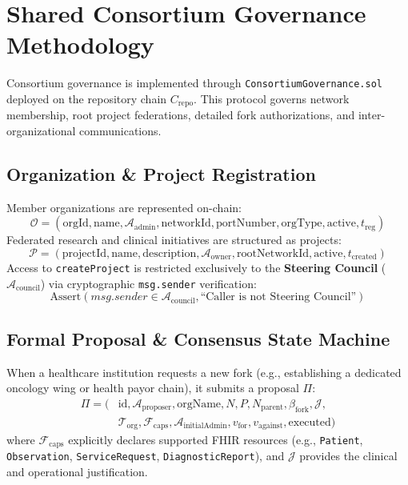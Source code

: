 \documentclass[conference]{IEEEtran}
\theoremstyle{definition}
\begin{document}
\section{Shared Consortium Governance Methodology}

Consortium governance is implemented through \texttt{ConsortiumGovernance.sol} deployed on the repository chain $C_{\text{repo}}$. This protocol governs network membership, root project federations, detailed fork authorizations, and inter-organizational communications.

\subsection{Organization \& Project Registration}
Member organizations are represented on-chain:
\begin{equation}
\mathcal{O} = (\text{orgId}, \text{name}, \mathcal{A}_{\text{admin}}, \text{networkId}, \text{portNumber}, \text{orgType}, \text{active}, t_{\text{reg}})
\end{equation}
Federated research and clinical initiatives are structured as projects:
\begin{equation}
\mathcal{P} = (\text{projectId}, \text{name}, \text{description}, \mathcal{A}_{\text{owner}}, \text{rootNetworkId}, \text{active}, t_{\text{created}})
\end{equation}
Access to \texttt{createProject} is restricted exclusively to the \textbf{Steering Council} ($\mathcal{A}_{\text{council}}$) via cryptographic \texttt{msg.sender} verification:
\begin{equation}
\text{Assert}(msg.sender \in \mathcal{A}_{\text{council}}, \text{``Caller is not Steering Council''})
\end{equation}

\subsection{Formal Proposal \& Consensus State Machine}
When a healthcare institution requests a new fork (e.g., establishing a dedicated oncology wing or health payor chain), it submits a proposal $\Pi$:
\begin{equation}
\begin{aligned}
\Pi = (& \text{id}, \mathcal{A}_{\text{proposer}}, \text{orgName}, N, P, N_{\text{parent}}, \beta_{\text{fork}}, \mathcal{J}, \\
       & \mathcal{T}_{\text{org}}, \mathcal{F}_{\text{caps}}, \mathcal{A}_{\text{initialAdmin}}, v_{\text{for}}, v_{\text{against}}, \text{executed} )
\end{aligned}
\end{equation}
where $\mathcal{F}_{\text{caps}}$ explicitly declares supported FHIR resources (e.g., \texttt{Patient}, \texttt{Observation}, \texttt{ServiceRequest}, \texttt{DiagnosticReport}), and $\mathcal{J}$ provides the clinical and operational justification.
\end{document}

